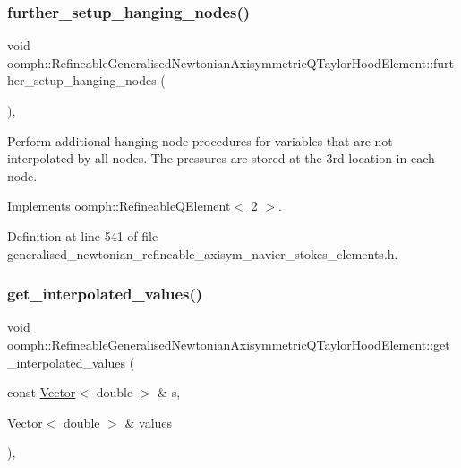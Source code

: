 \subsubsection{\texorpdfstring{further\+\_\+setup\+\_\+hanging\+\_\+nodes()}{further\_setup\_hanging\_nodes()}}
{\footnotesize\ttfamily void oomph\+::\+Refineable\+Generalised\+Newtonian\+Axisymmetric\+Q\+Taylor\+Hood\+Element\+::further\+\_\+setup\+\_\+hanging\+\_\+nodes (\begin{DoxyParamCaption}{ }\end{DoxyParamCaption})\hspace{0.3cm}{\ttfamily [inline]}, {\ttfamily [virtual]}}



Perform additional hanging node procedures for variables that are not interpolated by all nodes. The pressures are stored at the 3rd location in each node. 



Implements \hyperlink{classoomph_1_1RefineableQElement_3_012_01_4_a01e1eb063dd2c98ebb42d87959ca6b88}{oomph\+::\+Refineable\+Q\+Element$<$ 2 $>$}.



Definition at line 541 of file generalised\+\_\+newtonian\+\_\+refineable\+\_\+axisym\+\_\+navier\+\_\+stokes\+\_\+elements.\+h.

\mbox{\label{classoomph_1_1RefineableGeneralisedNewtonianAxisymmetricQTaylorHoodElement_a07b618a91cee532eb03474b158f8b59f}} 
\subsubsection{\texorpdfstring{get\+\_\+interpolated\+\_\+values()}{get\_interpolated\_values()}\hspace{0.1cm}{\footnotesize\ttfamily [1/2]}}
{\footnotesize\ttfamily void oomph\+::\+Refineable\+Generalised\+Newtonian\+Axisymmetric\+Q\+Taylor\+Hood\+Element\+::get\+\_\+interpolated\+\_\+values (\begin{DoxyParamCaption}\item[{const \hyperlink{classoomph_1_1Vector}{Vector}$<$ double $>$ \&}]{s,  }\item[{\hyperlink{classoomph_1_1Vector}{Vector}$<$ double $>$ \&}]{values }\end{DoxyParamCaption})\hspace{0.3cm}{\ttfamily [inline]}, {\ttfamily [virtual]}}



